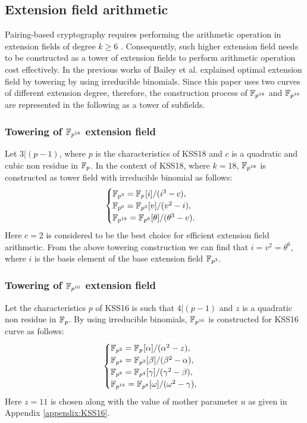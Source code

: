 \subsection{Extension field arithmetic}
Pairing-based cryptography requires  performing the arithmetic operation in extension fields of degree $k \geq 6$ \cite{Silverman}. Consequently, such higher extension field needs to be constructed as a tower of extension fields \cite{EPRINT:BenSco09} to perform arithmetic operation cost effectively. In the previous works of Bailey et al. \cite{JC:BaiPaa01} explained optimal extension field by towering by using irreducible binomials. Since this paper uses two curves of different extension degree, therefore, the construction process of $\mathbb{F}_{p^{18}}$ and $\mathbb{F}_{p^{16}}$ are represented in the following as a tower of subfields. 

\subsubsection{Towering of $\mathbb{F}_{p^{18}}$ extension field}
Let $3|(p-1)$, where $p$ is the characteristics of KSS18 and $c$ is a quadratic and cubic non residue in ${\mathbb{F}}_{p}$. In the context  of KSS18, where $k=18$, $\mathbb{F}_{p^{18}}$ is constructed as tower field with irreducible binomial as follows:
\begin{equation}\label{eq:KSS18_towering}
\begin{cases}
{\mathbb{F}}_{p^{3}} = {\mathbb{F}}_{p^{}}[i]/(i^3-c),  \\ 
{\mathbb{F}}_{p^{6}} = {\mathbb{F}}_{p^{3}}[v]/(v^2-i),  \\ 
{\mathbb{F}}_{p^{18}} = {\mathbb{F}}_{p^{6}}[\theta]/(\theta^3-v). \\ 
\end{cases}
\end{equation}
Here $c = 2$ is considered to be the best choice for efficient extension field arithmetic.
From the above towering construction we can find that $i=v^2=\theta^6$, where $i$ is the basis element of the base extension field $\mathbb{F}_{p^3}$. 

\subsubsection{Towering of $\mathbb{F}_{p^{16}}$ extension field}
Let the characteristics $p$ of KSS16 is such that  $4|(p-1)$  and $z$ is a quadratic non residue in ${\mathbb{F}}_{p}$. By using irreducible binomials, $\mathbb{F}_{p^{16}}$ is constructed for KSS16 curve  as follows:
\begin{equation}\label{eq_bls_towering}
\begin{cases}
{\mathbb{F}}_{p^{2}} = {\mathbb{F}}_{p^{}}[\alpha]/(\alpha^2-z),  \\ 
{\mathbb{F}}_{p^{4}} = {\mathbb{F}}_{p^{2}}[\beta]/(\beta^2-\alpha),  \\ 
{\mathbb{F}}_{p^{8}} = {\mathbb{F}}_{p^{4}}[\gamma]/(\gamma^2-\beta), \\ 
{\mathbb{F}}_{p^{16}} = {\mathbb{F}}_{p^{8}}[\omega]/(\omega^2-\gamma), \\ 
\end{cases}
\end{equation}
Here $z = 11$ is chosen along with the value of mother parameter $u$ as given in Appendix \ref{appendix:KSS16}.

